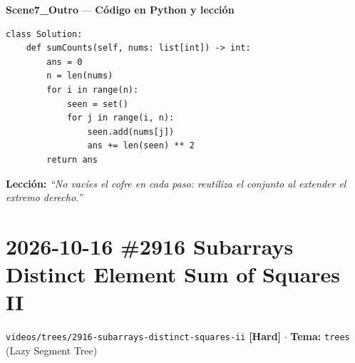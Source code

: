 \documentclass[letterpaper,10pt]{article}
\newcommand{\scene}[2]{\noindent\textbf{\textcolor{mcaqua}{#1}} --- \textbf{#2}\par\vspace{1pt}}
\newcommand{\folder}[1]{\texttt{\textcolor{mcgreen}{#1}}}
\newcommand{\badge}[2]{\textbf{\textcolor{#1}{[#2]}}}
\begin{document}
\scene{Scene7\_Outro}{C\'odigo en Python y lecci\'on}
\begin{Verbatim}[frame=single,fontsize=\small]
class Solution:
    def sumCounts(self, nums: list[int]) -> int:
        ans = 0
        n = len(nums)
        for i in range(n):
            seen = set()
            for j in range(i, n):
                seen.add(nums[j])
                ans += len(seen) ** 2
        return ans
\end{Verbatim}
\textbf{Lecci\'on:} \textit{``No vac\'ies el cofre en cada paso: reutiliza el conjunto al extender el extremo derecho.''}

\newpage

\section{2026-10-16 \textbar{} \#2916 Subarrays Distinct Element Sum of Squares II}
\folder{videos/trees/2916-subarrays-distinct-squares-ii} \hfill \badge{mcred}{Hard} $\cdot$ \textbf{Tema:} \texttt{trees} (Lazy Segment Tree)
\end{document}
